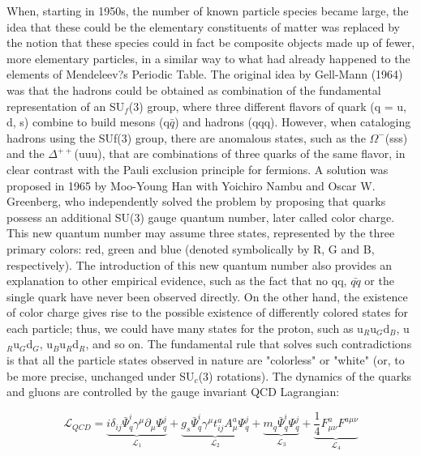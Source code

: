 When, starting in 1950s, the number of known particle species became large, the idea that these could be the elementary constituents of matter was replaced by the notion that these species could in fact be composite objects made up of fewer, more elementary particles, in a similar way to what had already happened to the elements of Mendeleev?s Periodic Table. The original idea by Gell-Mann (1964) was that the hadrons could be obtained as combination of the fundamental representation of an SU$_{f}$(3) group, where three different flavors of quark (q = u, d, s) combine to build mesons (q$\bar{q}$) and hadrons (qqq).
However, when cataloging hadrons using the SUf(3) group, there are anomalous states, such as the $\Omega^{-}$(sss) and the  $\Delta^{++}$(uuu), that are combinations of three quarks of the same flavor, in clear contrast with the Pauli exclusion principle for fermions. A solution was proposed in 1965 by Moo-Young Han with Yoichiro Nambu and Oscar W. Greenberg, who independently solved the problem by proposing that quarks possess an additional SU(3) gauge quantum number, later called color charge.
This new quantum number may assume three states, represented by the three primary colors: red, green and blue (denoted symbolically by R, G and B, respectively). The introduction of this new quantum number also provides an explanation to other empirical evidence, such as the fact that no qq, $\bar{qq}$ or the single quark have never been observed directly. On the other hand, the existence of color charge gives rise to the possible existence of differently colored states for each particle; thus, we could have many states for the proton, such as u$_{R}$u$_{G}$d$_{B}$, u$_{R}$u$_{G}$d$_{G}$, u$_{B}$u$_{R}$d$_{R}$, and so on. The fundamental rule that solves such contradictions is that all the particle states observed in nature are "colorless" or "white" (or, to be more precise, unchanged under SU$_{c}$(3) rotations).
The dynamics of the quarks and gluons are controlled by the gauge invariant QCD Lagrangian:


\begin{equation}\label{label:L}
\mathcal{L}_{QCD} = \underbrace{i\delta_{ij}\bar{\Psi}^{i}_{q}\gamma^{\mu}\partial_{\mu}\Psi^{j}_{q}}_{\mathcal{L}_{1}}+ \underbrace{g_{s}\bar{\Psi}^{i}_{q}\gamma^{\mu}t_{ij}^{a}A_{\mu}^{a}\Psi^{j}_{q}}_{\mathcal{L}_{2}}+ \underbrace{m_{q}\bar{\Psi}^{i}_{q}\Psi^{j}_{q}}_{\mathcal{L}_{3}}+ \underbrace{\frac{1}{4}F_{\mu\nu}^{a}F^{a \mu\nu}}_{\mathcal{L}_{4}}
\end{equation}

